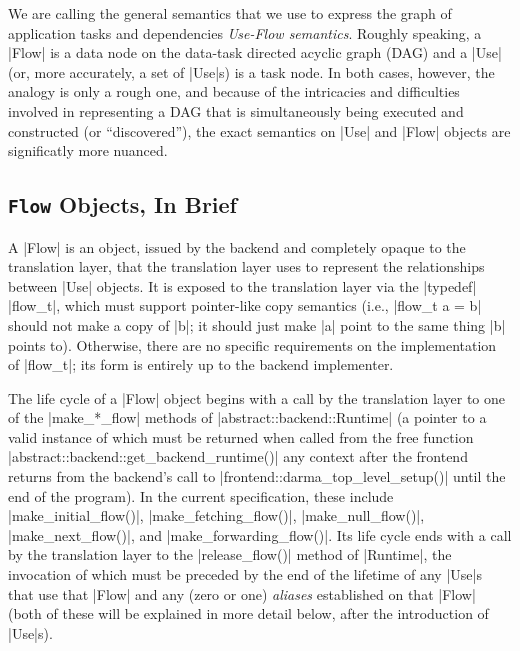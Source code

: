We are calling the general semantics that we use to express the graph of application tasks and
dependencies {\it Use-Flow semantics}.  Roughly speaking, a |Flow| is a data node on the data-task
directed acyclic graph (DAG) and a |Use| (or, more accurately, a set of |Use|s) is a task node.  In
both cases, however, the analogy is only a rough one, and because of the intricacies and
difficulties involved in representing a DAG that is simultaneously being executed and constructed
(or ``discovered''), the exact semantics on |Use| and |Flow| objects are significatly more nuanced.

\subsection{{\tt Flow} Objects, In Brief}

A |Flow| is an object, issued by the backend and completely opaque to the translation layer, that
the translation layer uses to represent the relationships between |Use| objects.  It is exposed to
the translation layer via the |typedef| |flow_t|, which must support pointer-like copy semantics
(i.e., |flow_t a = b| should not make a copy of |b|; it should just make |a| point to the same
thing |b| points to).  Otherwise, there are no specific requirements on the implementation of
|flow_t|; its form is entirely up to the backend implementer.

The life cycle of a |Flow| object begins with a call by the translation layer to one of the
|make_*_flow| methods of |abstract::backend::Runtime| (a pointer to a valid instance of which must
be returned when called from the free function |abstract::backend::get_backend_runtime()| any
context after the frontend returns from the backend's call to |frontend::darma_top_level_setup()|
until the end of the program).  In the current specification, these
include |make_initial_flow()|, |make_fetching_flow()|, |make_null_flow()|, |make_next_flow()|,
and |make_forwarding_flow()|.  Its life cycle ends with a call by the translation layer to
the |release_flow()| method of |Runtime|, the invocation of which must be preceded by the 
end of the lifetime of any |Use|s that use that |Flow| and any (zero or one) {\it aliases}
established on that |Flow| (both of these will be explained in more detail below, after the
introduction of |Use|s).

